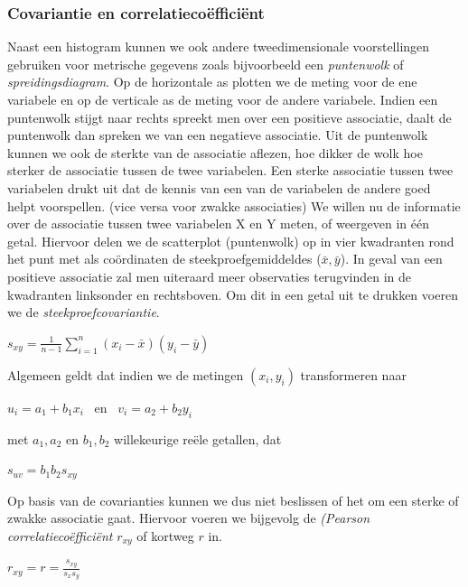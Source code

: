 \documentclass[titlepage]{article}
\numberwithin{equation}{section}
\begin{document}
 \subsubsection{Covariantie en correlatiecoëfficiënt}
 Naast een histogram kunnen we ook andere tweedimensionale voorstellingen gebruiken voor metrische gegevens zoals bijvoorbeeld een \textit{puntenwolk} of \textit{spreidingsdiagram}. Op de horizontale as plotten we de meting voor de ene variabele en op de verticale as de meting voor de andere variabele.\newline\newline
 Indien een puntenwolk stijgt naar rechts spreekt men over een positieve associatie, daalt de puntenwolk dan spreken we van een negatieve associatie.\newline
 Uit de puntenwolk kunnen we ook de sterkte van de associatie aflezen, hoe dikker de wolk hoe sterker de associatie tussen de twee variabelen. Een sterke associatie tussen twee variabelen drukt uit dat de kennis van een van de variabelen de andere goed helpt voorspellen. (vice versa voor zwakke associaties)\newline\newline
 We willen nu de informatie over de associatie tussen twee variabelen X en Y meten, of weergeven in één getal. Hiervoor delen we de scatterplot (puntenwolk) op in vier kwadranten rond het punt met als coördinaten de steekproefgemiddeldes ($\bar{x}, \bar{y}$). In geval van een positieve associatie zal men uiteraard meer observaties terugvinden in de kwadranten linksonder en rechtsboven. Om dit in een getal uit te drukken voeren we de \textit{steekproefcovariantie}.
 \begin{center}
 	$s_{xy} = \frac{1}{n - 1}\sum\limits_{i=1}^n (x_{i} - \bar{x})(y_{i} - \bar{y})$
 \end{center}
 Algemeen geldt dat indien we de metingen $(x_{i}, y_{i})$ transformeren naar
 \begin{center}
 	$u_{i} = a_{1} + b_{1}x_{i}$ \ en \ $v_{i} = a_{2} + b_{2}y_{i}$
 \end{center}
 met $a_{1}, a_{2}$ en $b_{1}, b_{2}$ willekeurige reële getallen, dat
 \begin{center}
 	$s_{uv} = b_{1}b_{2}s_{xy}$
 \end{center}
 Op basis van de covarianties kunnen we dus niet beslissen of het om een sterke of zwakke associatie gaat. Hiervoor voeren we bijgevolg de \textit{(Pearson correlatiecoëfficiënt} $r_{xy}$ of kortweg $r$ in.
 \begin{center}
 	$r_{xy} = r = \frac{s_{xy}}{s_{x}s_{y}}$  
 \end{center}
\end{document}

